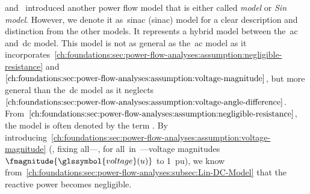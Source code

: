 \textcite[pp.60; Equation 1]{Don05} and~\textcite[p.1791; Equation 3.1]{Pin10}
introduced another power flow model that is either called
\emph{ model} or \emph{Sin model}. However, we denote it
as~\acrlong{sinac} (\gls{sinac}) model for a clear description and
distinction from the other models. It represents a hybrid model between
the~\gls{ac} and~\gls{dc} model. This model is not as general as
the~\gls{ac} model as it
incorporates~\cref{ch:foundations:sec:power-flow-analyses:assumption:negligible-resistance}
and~\mbox{$\cref{ch:foundations:sec:power-flow-analyses:assumption:voltage-magnitude}$,}
but more general than the~\gls{dc} model as it
neglects~$\cref{ch:foundations:sec:power-flow-analyses:assumption:voltage-angle-difference}$.
From~$\cref{ch:foundations:sec:power-flow-analyses:assumption:negligible-resistance}$,
the model is often denoted by the term . By
introducing~\cref{ch:foundations:sec:power-flow-analyses:assumption:voltage-magnitude}
(\ie, fixing all---\ie, for all~\vertexa in~---voltage
magnitudes~$\fmagnitude{\glssymbol{voltage}(\vertexa)}$ to 1~\gls{pu}), we
know from~\cref{ch:foundations:sec:power-flow-analyses:subsec:Lin-DC-Model} that
the reactive power becomes negligible.

